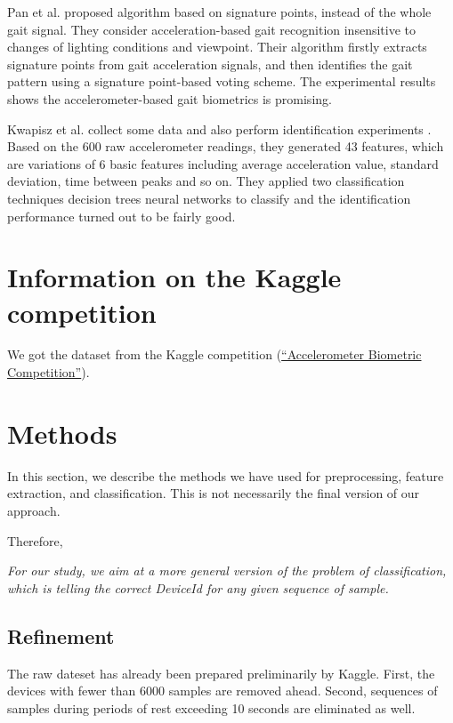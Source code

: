 \documentclass{article} %
\begin{document}
Pan et al. \cite{Pan:EL2009} proposed algorithm based on signature points, instead of the whole gait signal. They consider acceleration-based gait recognition insensitive to changes of lighting conditions and viewpoint. Their algorithm firstly extracts signature points from gait acceleration signals, and then identifies the gait pattern using a signature point-based voting scheme. The experimental results shows the accelerometer-based gait biometrics is promising. 

Kwapisz et al.\cite{Kwapisz:BTAS2009} collect some data and also perform identification experiments . Based on the 600 raw accelerometer readings, they generated 43 features, which are variations of 6 basic features including average acceleration value, standard deviation, time between peaks and so on. They applied two classification techniques decision trees neural networks to classify and the identification performance turned out to be fairly good.


\section{Information on the Kaggle competition}
We got the dataset from the Kaggle competition (\href{http://www.kaggle.com/c/accelerometer-biometric-competition}{``Accelerometer Biometric Competition''}).

\section{Methods}
In this section, we describe the methods we have used for preprocessing, feature extraction, and classification. This is not necessarily the final version of our approach. 

Therefore, 

 \emph{For our study, we aim at a more general version of the problem of classification, which is telling the correct DeviceId for any given sequence of sample.}

\subsection{Refinement}
The raw dateset has already been prepared preliminarily by Kaggle. First, the devices with fewer than 6000 samples are removed ahead. Second, sequences of samples during periods of rest exceeding 10 seconds are eliminated as well. 
\end{document}
